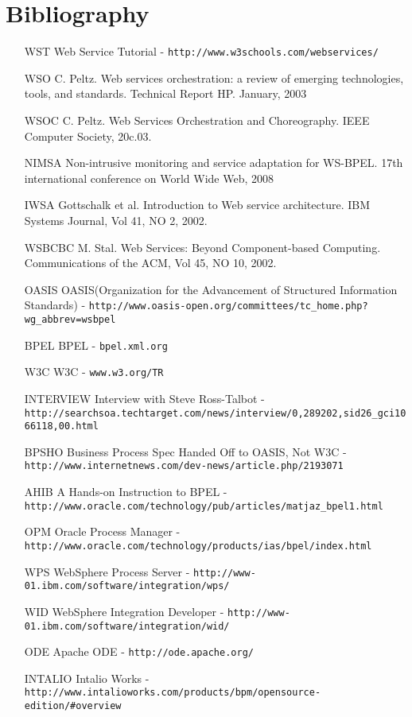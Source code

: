 \documentclass[12pt,a4paper]{article}
\begin{document}
\section{Bibliography}
\begin{itemize}
\item[WST] Web Service Tutorial - \verb!http://www.w3schools.com/webservices/!

\item[WSO] C. Peltz. Web services orchestration: a review of emerging technologies, tools, and standards. Technical Report HP. January, 2003

\item[WSOC] C. Peltz. Web Services Orchestration and Choreography. IEEE Computer Society, 20c.03.

\item[NIMSA] Non-intrusive monitoring and service adaptation for WS-BPEL. 17th international conference on World Wide Web, 2008

\item[IWSA] Gottschalk et al. Introduction to Web service architecture. IBM Systems Journal, Vol 41, NO 2, 2002.

\item[WSBCBC] M. Stal. Web Services: Beyond Component-based Computing. Communications of the ACM, Vol 45, NO 10, 2002.

\item[OASIS] OASIS(Organization for the Advancement of Structured Information Standards) - \verb!http://www.oasis-open.org/committees/tc_home.php?wg_abbrev=wsbpel!

\item[BPEL] BPEL - \verb!bpel.xml.org!

\item[W3C] W3C - \verb!www.w3.org/TR!

\item[INTERVIEW] Interview with Steve Ross-Talbot - \verb!http://searchsoa.techtarget.com/news/interview/0,289202,sid26_gci1066118,00.html!

\item[BPSHO] Business Process Spec Handed Off to OASIS, Not W3C - \verb!http://www.internetnews.com/dev-news/article.php/2193071!

\item[AHIB] A Hands-on Instruction to BPEL - \verb!http://www.oracle.com/technology/pub/articles/matjaz_bpel1.html!

\item[OPM] Oracle Process Manager - \verb!http://www.oracle.com/technology/products/ias/bpel/index.html!

\item[WPS] WebSphere Process Server - \verb!http://www-01.ibm.com/software/integration/wps/!

\item[WID] WebSphere Integration Developer - \verb!http://www-01.ibm.com/software/integration/wid/!

\item[ODE] Apache ODE - \verb!http://ode.apache.org/!

\item[INTALIO] Intalio Works - \verb!http://www.intalioworks.com/products/bpm/opensource-edition/#overview!
\end{itemize}
\end{document}
